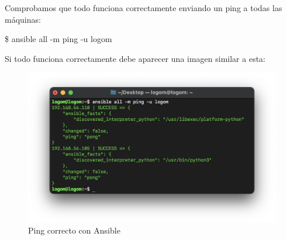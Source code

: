 Comprobamos que todo funciona correctamente enviando un ping a todas las máquinas:
    \begin{tcolorbox}[colback=black!10, halign=left]
        \$ ansible all -m ping -u logom
    \end{tcolorbox}

Si todo funciona correctamente debe aparecer una imagen similar a esta:
    \begin{figure}[H]
        \centering
        \includegraphics[scale=0.7]{images/ansible_ping.png}
        \caption{Ping correcto con Ansible}
        \label{fig:ansible_ping}
    \end{figure}



